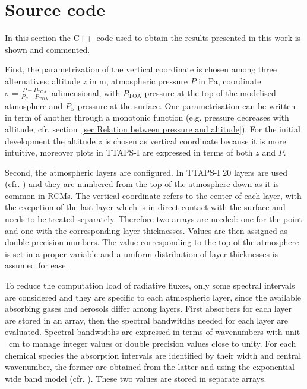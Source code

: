 \documentclass[a4paper,10pt,twocolumn,\classoptions]{article}
\newcommand{\cpp}{C++}
\newcommand{\PTOA}{P_\text{TOA}}
\begin{document}

\newpage
\appendix

\section{Source code}
In this section the \cpp\ code used to obtain the results presented in this work is shown and commented.

First, the parametrization of the vertical coordinate is chosen among three alternatives: altitude $z$ in \unit{\metre}, atmospheric pressure $P$ in \unit{\pascal}, coordinate $\sigma = \frac{P - \PTOA}{P_S - \PTOA}$ adimensional, with $\PTOA$ pressure at the top of the modelised atmosphere and $P_S$ pressure at the surface. One parametrisation can be written in term of another through a monotonic function (e.g. pressure decreases with altitude, cfr. section~\ref{sec:Relation between pressure and altitude}). For the initial development the altitude $z$ is chosen as vertical coordinate because it is more intuitive, moreover plots in TTAPS-I are expressed in terms of both $z$ and $P$.

Second, the atmospheric layers are configured. In TTAPS-I 20 layers are used (cfr. \cite[396]{NuclearWinterPhysics}) and they are numbered from the top of the atmosphere down as it is common in RCMs. The vertical coordinate refers to the center of each layer, with the excpetion of the last layer which is in direct contact with the surface and needs to be treated separately. %
Therefore two arrays are needed: one for the point and one with the corresponding layer thicknesses. Values are then assigned as double precision numbers. The value corresponding to the top of the atmosphere is set in a proper variable and a uniform distribution of layer thicknesses is assumed for ease.

To reduce the computation load of radiative fluxes, only some spectral intervals are considered and they are specific to each atmospheric layer, since the available absorbing gases and aerosols differ among layers. First absorbers for each layer are stored in an array, then the spectral bandwitdhs needed for each layer are evaluated. Spectral bandwidths are expressed in terms of wavenumbers with unit \unit{\per\centi\metre} to manage integer values or double precision values close to unity. For each chemical species the absorption intervals are identified by their width and central wavenumber, the former are obtained from the latter and using the exponential wide band model (cfr. \cite[360]{Modest}). These two values are stored in separate arrays.
\end{document}
